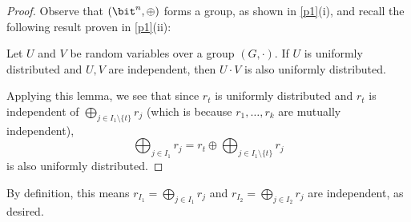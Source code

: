 \begin{answer}[i]
\begin{proof}
        Observe that $(\bit^n,\oplus)$ forms a group, as shown in \autoref{p1}(i), and recall the following result proven in \autoref{p1}(ii):
        \begin{lemma*}[\autoref{p1}(ii)]
            Let $U$ and $V$ be random variables over a group $(G,\cdot)$. If $U$ is uniformly distributed and $U,V$ are independent, then $U\cdot V$ is also uniformly distributed. 
        \end{lemma*}
        Applying this lemma, we see that since $r_{t}$ is uniformly distributed and $r_{t}$ is independent of $\bigoplus_{j\in I_1\setminus\{t\}} r_j$ (which is because $r_1,\ldots,r_k$ are mutually independent), \[\bigoplus_{j\in I_1} r_j = r_{t} \oplus \bigoplus_{j\in I_1\setminus\{t\}} r_j\] is also uniformly distributed.
    \end{proof}

    By definition, this means  $r_{I_1}=\bigoplus_{j\in I_1} r_j$ and $r_{I_2}=\bigoplus_{j\in I_2} r_j$ are independent, as desired.
\end{answer}





